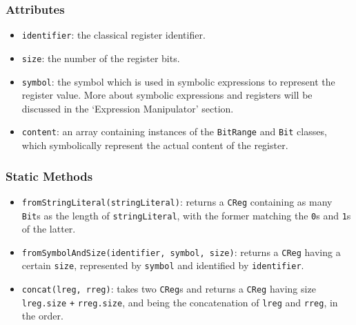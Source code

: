 \documentclass[12pt,a4paper]{report}
\theoremstyle{definition}
\theoremstyle{definition}
\theoremstyle{definition}
\begin{document}
\subsubsection{Attributes}
\begin{itemize}
    \itemsep 0em
    \item \texttt{identifier}: the classical register identifier.
    \item \texttt{size}: the number of the register bits.
    \item \texttt{symbol}: the symbol which is used in symbolic expressions to represent the register value. More about symbolic expressions and registers will be discussed in the `Expression Manipulator' section.
    \item \texttt{content}: an array containing instances of the \texttt{BitRange} and \texttt{Bit} classes, which symbolically represent the actual content of the register.
\end{itemize}
\subsubsection{Static Methods}
\begin{itemize}
    \item \texttt{fromStringLiteral(stringLiteral)}: returns a \texttt{CReg} containing as many \texttt{Bit}s as the length of \texttt{stringLiteral}, with the former matching the \texttt{0}s and \texttt{1}s of the latter.
    \item \texttt{fromSymbolAndSize(identifier, symbol, size)}: returns a \texttt{CReg} having a certain \texttt{size}, represented by \texttt{symbol} and identified by \texttt{identifier}.
    \item \texttt{concat(lreg, rreg)}: takes two \texttt{CReg}s and returns a \texttt{CReg} having size \texttt{lreg.size} \texttt{+} \texttt{rreg.size}, and being the concatenation of \texttt{lreg} and \texttt{rreg}, in the order.
\end{itemize}
\end{document}

